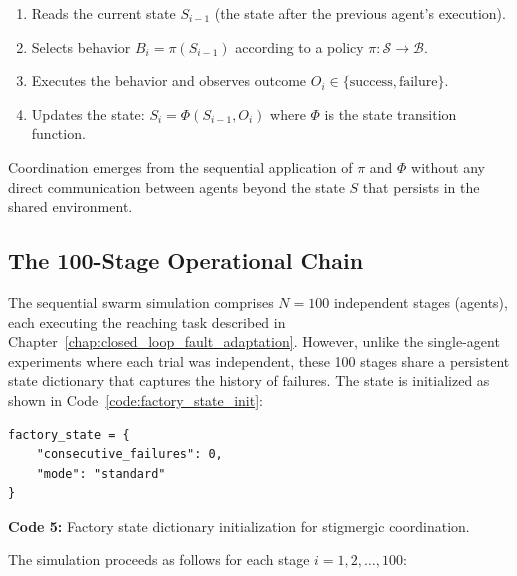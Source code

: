 \documentclass[12pt,a4paper,oneside]{report}
\begin{document}
\begin{enumerate}
    \item Reads the current state $S_{i-1}$ (the state after the previous agent's execution).
    \item Selects behavior $B_i = \pi(S_{i-1})$ according to a policy $\pi: \mathcal{S} \rightarrow \mathcal{B}$.
    \item Executes the behavior and observes outcome $O_i \in \{\text{success}, \text{failure}\}$.
    \item Updates the state: $S_i = \Phi(S_{i-1}, O_i)$ where $\Phi$ is the state transition function.
\end{enumerate}

Coordination emerges from the sequential application of $\pi$ and $\Phi$ without any direct communication between agents beyond the state $S$ that persists in the shared environment.

\subsection{The 100-Stage Operational Chain}
\label{subsec:the_100_stage_operational_chain}

The sequential swarm simulation comprises $N = 100$ independent stages (agents), each executing the reaching task described in Chapter~\ref{chap:closed_loop_fault_adaptation}. However, unlike the single-agent experiments where each trial was independent, these 100 stages share a persistent state dictionary that captures the history of failures. The state is initialized as shown in Code~\ref{code:factory_state_init}:

\begin{verbatim}
factory_state = {
    "consecutive_failures": 0,
    "mode": "standard"
}
\end{verbatim}
\vspace{0.2cm}
{\small \textbf{Code 5:} Factory state dictionary initialization for stigmergic coordination.\label{code:factory_state_init}}
\vspace{0.3cm}

The simulation proceeds as follows for each stage $i = 1, 2, \ldots, 100$:
\end{document}
